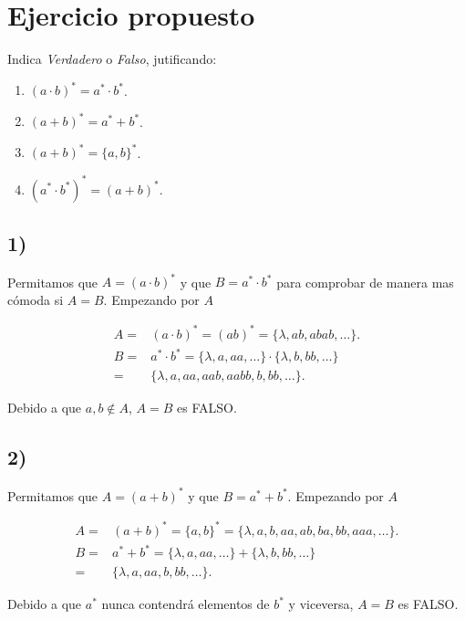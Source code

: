 \documentclass[stu, 12pt, letterpaper, donotrepeattitle, floatsintext, natbib]{apa7}
\begin{document}
\section*{Ejercicio propuesto}
\begin{justifying}
Indica \emph{Verdadero} o \emph{Falso}, jutificando:\par
\begin{enumerate}
    \item \((a\cdot b)^{*}=a^{*}\cdot b^{*}\).
    \item \((a+b)^{*}=a^{*}+b^{*}\).
    \item \((a+b)^{*}=\{a, b\}^{*}\).
    \item \(\left(a^{*}\cdot b^{*}\right)^{*}=(a+b)^{*}\).
\end{enumerate}
\subsection*{1)}
\begin{justifying}
    Permitamos que \(A=(a\cdot b)^{*}\) y que \(B=a^{*}\cdot b^{*}\) para comprobar de manera mas cómoda si \(A=B\).
    Empezando por \(A\)
\end{justifying}
\begin{equation*}
    \begin{align*}
        A = {}& (a\cdot b)^{*} = (ab)^{*} = \{\lambda, ab, abab, \dots\}. \\
        B = {}& a^{*}\cdot b^{*} = \{\lambda, a , aa, \dots\} \cdot  \{\lambda, b , bb, \dots\} \\
          = {}& \{\lambda, a, aa, aab, aabb, b, bb, \dots\}.
    \end{align*}
\end{equation*}
\begin{justifying}
    Debido a que \(a,b \notin A\), \(A=B\) es FALSO.\par
\end{justifying}
\vspace{\baselineskip}
\subsection*{2)}
\begin{justifying}
    Permitamos que \(A=(a+b)^{*}\) y que \(B=a^{*}+b^{*}\). Empezando por \(A\)
\end{justifying}
\begin{equation*}
    \begin{align*}
        A = {}& (a+b)^{*} = \{a, b\}^{*} = \{\lambda, a, b, aa, ab, ba, bb, aaa, \dots\}. \\
        B = {}& a^{*}+b^{*} = \{\lambda, a , aa, \dots\} + \{\lambda, b , bb, \dots\} \\
          = {}& \{\lambda, a, aa, b, bb, \dots\}.
    \end{align*}
\end{equation*}
\begin{justifying}
    Debido a que \(a^{*}\) nunca contendrá elementos de \(b^{*}\) y viceversa, \(A=B\) es FALSO.\par
\end{justifying}
\vspace{\baselineskip}

\end{justifying}
\end{document}
